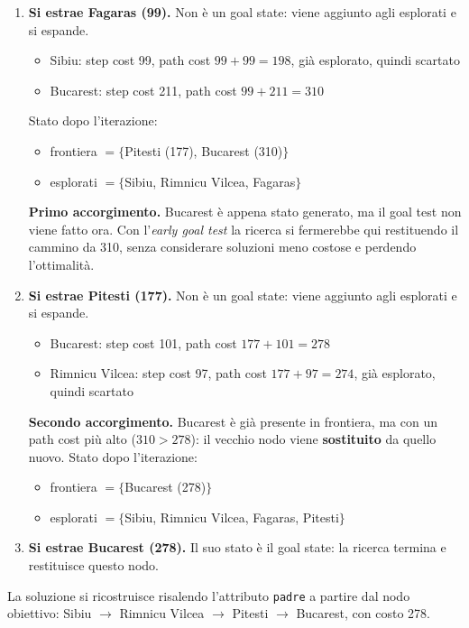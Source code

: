 \documentclass[a4paper, 11pt, oneside]{book}
\theoremstyle{definition}
\begin{document}
\begin{enumerate}
		\item \textbf{Si estrae Fagaras (99).} Non \`e un goal state: viene aggiunto agli
			esplorati e si espande.
			\begin{itemize}
				\item Sibiu: step cost 99, path cost $99 + 99 = 198$, gi\`a esplorato,
					quindi scartato
				\item Bucarest: step cost 211, path cost $99 + 211 = 310$
			\end{itemize}
			Stato dopo l'iterazione:
			\begin{itemize}
				\item frontiera $= \{$Pitesti (177), Bucarest (310)$\}$
				\item esplorati $= \{$Sibiu, Rimnicu Vilcea, Fagaras$\}$
			\end{itemize}

			\textbf{Primo accorgimento.} Bucarest \`e appena stato generato, ma il goal
			test non viene fatto ora. Con l'\emph{early goal test} la ricerca si
			fermerebbe qui restituendo il cammino da 310, senza considerare soluzioni
			meno costose e perdendo l'ottimalit\`a.

		\item \textbf{Si estrae Pitesti (177).} Non \`e un goal state: viene aggiunto
			agli esplorati e si espande.
			\begin{itemize}
				\item Bucarest: step cost 101, path cost $177 + 101 = 278$
				\item Rimnicu Vilcea: step cost 97, path cost $177 + 97 = 274$, gi\`a
					esplorato, quindi scartato
			\end{itemize}

			\textbf{Secondo accorgimento.} Bucarest \`e gi\`a presente in frontiera, ma con
			un path cost pi\`u alto ($310 > 278$): il vecchio nodo viene
			\textbf{sostituito} da quello nuovo. Stato dopo l'iterazione:
			\begin{itemize}
				\item frontiera $= \{$Bucarest (278)$\}$
				\item esplorati $= \{$Sibiu, Rimnicu Vilcea, Fagaras, Pitesti$\}$
			\end{itemize}

		\item \textbf{Si estrae Bucarest (278).} Il suo stato \`e il goal state: la
			ricerca termina e restituisce questo nodo.
	\end{enumerate}

	La soluzione si ricostruisce risalendo l'attributo \texttt{padre} a partire dal nodo
	obiettivo: Sibiu $\rightarrow$ Rimnicu Vilcea $\rightarrow$ Pitesti $\rightarrow$
	Bucarest, con costo 278.
\end{document}
